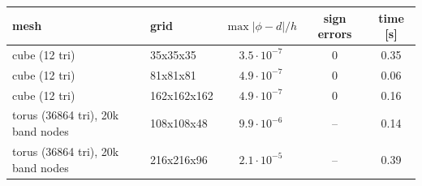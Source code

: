 \begin{tabular}{llccc}
\toprule
mesh & grid & $\max|\phi-d|/h$ & sign errors & time [s] \\
\midrule
cube (12 tri) & 35x35x35 & $3.5\cdot 10^{-7}$ & 0 & 0.35 \\
cube (12 tri) & 81x81x81 & $4.9\cdot 10^{-7}$ & 0 & 0.06 \\
cube (12 tri) & 162x162x162 & $4.9\cdot 10^{-7}$ & 0 & 0.16 \\
torus (36864 tri), 20k band nodes & 108x108x48 & $9.9\cdot 10^{-6}$ & -- & 0.14 \\
torus (36864 tri), 20k band nodes & 216x216x96 & $2.1\cdot 10^{-5}$ & -- & 0.39 \\
\bottomrule
\end{tabular}
